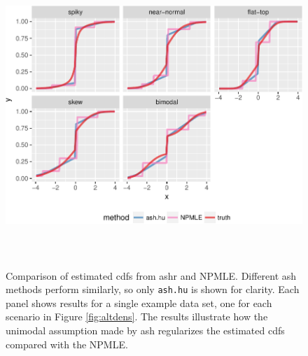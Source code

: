 \documentclass[11pt]{article}
\begin{document}
\begin{figure}[h!] 
\begin{center}
	\includegraphics[height=4.5in]{../analysis/figure/plot_cdf_eg.Rmd/egcdf-reduce-with-npmle-1.pdf}
	\caption{Comparison of estimated cdfs from ashr and NPMLE. Different ash methods perform similarly, so only {\tt ash.hu} is shown for clarity. Each panel shows results for a single example data set, one for each scenario in Figure \ref{fig:altdens}. The results illustrate how the unimodal assumption made by ash regularizes the estimated cdfs compared with the NPMLE.} \label{fig:egcdf}
\end{center}
\end{figure}



 
\end{document}

